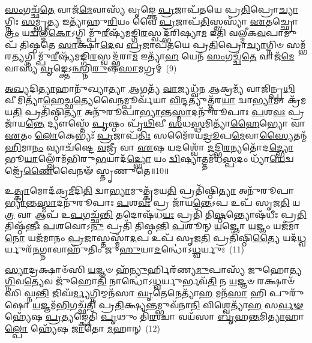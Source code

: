 \-\ul{𑌸𑌂}\-𑌗𑌚𑍍𑌛᳴\-\ul{𑌤𑍇} 𑌵𑌾𑌜᳴\-\ul{𑌮𑍇}\-𑌵𑌾𑌸𑍍𑌯᳴ 𑌵𑍃𑌙𑍍𑌕𑍍𑌤𑍇 \ul{𑌪𑍍𑌰}\-𑌜𑌾𑌪᳴𑌤𑌯𑍇 𑌪𑍍𑌰\-\ul{𑌤𑌿}\-𑌪𑍍𑌰𑍋\-\ul{𑌚𑍍𑌯𑌾}\-𑌗𑍍𑌨𑌿𑌃 \ul{𑌸}\-𑌮𑍍𑌭𑍃\-\ul{𑌤𑍍𑌯} 𑌇𑌤𑍍𑌯𑌾᳴𑌹𑍁\-\ul{𑌰𑌿}\-𑌯𑌂 𑌵𑍈 \ul{𑌪𑍍𑌰}\-𑌜𑌾𑌪᳴\-\ul{𑌤𑌿}\-𑌸𑍍𑌤𑌸𑍍𑌯𑌾᳴ \ul{𑌏}\-𑌤𑌚𑍍𑌛𑍍𑌰𑍋\-\ul{𑌤𑍍𑌰𑌂} 𑌯\-\ul{𑌦𑍍𑌵}\-𑌲𑍍𑌮𑍀\-\ul{𑌕𑍋}\-\-𑌽𑌗𑍍𑌨𑌿𑌮𑍍𑌪𑍁᳴\-\ul{𑌰𑍀}\-𑌷𑍍𑌯᳴𑌮𑌙𑍍𑌗𑌿\-\ul{𑌰}\-𑌸𑍍𑌵𑌦𑍍𑌭᳴𑌰𑌿𑌷𑍍𑌯𑌾\-\ul{𑌮} 𑌇𑌤𑌿᳴ 𑌵𑌲𑍍𑌮𑍀𑌕\-\ul{𑌵}\-𑌪𑌾𑌮𑍁𑌪᳴ 𑌤𑌿𑌷𑍍𑌠𑌤𑍇 \ul{𑌸𑌾}\-𑌕𑍍𑌷𑌾\-\ul{𑌦𑍇}\-𑌵 \ul{𑌪𑍍𑌰}\-𑌜𑌾𑌪᳴𑌤𑌯𑍇 𑌪𑍍𑌰\-\ul{𑌤𑌿}\-𑌪𑍍𑌰𑍋\-\ul{𑌚𑍍𑌯𑌾}\-𑌗𑍍𑌨𑌿𑍞 𑌸𑌮𑍍𑌭᳴𑌰\-\ul{𑌤𑍍𑌯}\-𑌗𑍍𑌨𑌿𑌮𑍍𑌪𑍁᳴\-\ul{𑌰𑍀}\-𑌷𑍍𑌯᳴𑌮𑌙𑍍𑌗𑌿\-\ul{𑌰}\-𑌸𑍍𑌵𑌦𑍍𑌭᳴𑌰𑌾\-\ul{𑌮} 𑌇𑌤𑍍𑌯𑌾᳴\-\ul{𑌹} 𑌯𑍇𑌨᳴ \ul{𑌸𑌂}\-𑌗𑌚𑍍𑌛᳴\-\ul{𑌤𑍇} 𑌵𑌾𑌜᳴\-\ul{𑌮𑍇}\-𑌵𑌾𑌸𑍍𑌯᳴ \ul{𑌵𑍃}\-𑌙𑍍𑌕𑍍𑌤𑍇\-𑌽\-\ul{𑌨𑍍𑌵}\-𑌗𑍍𑌨𑌿\-\ul{𑌰𑍁}\-𑌷\-\ul{𑌸𑌾}\-𑌮𑌗𑍍𑌰𑌮𑍍॑~(9)

\-\ul{𑌅}\-\-\ul{𑌖𑍍𑌯}\-𑌦𑌿\-\ul{𑌤𑍍𑌯𑌾}\-𑌹𑌾𑌨𑍁᳴𑌖𑍍𑌯𑌾𑌤𑍍𑌯𑌾 \ul{𑌆}\-𑌗𑌤𑍍𑌯᳴ \ul{𑌵𑌾}\-𑌜𑍍𑌯𑌧𑍍𑌵᳴𑌨 \ul{𑌆}\-𑌕𑍍𑌰𑌮𑍍𑌯᳴ 𑌵𑌾𑌜𑌿𑌨𑍍𑌪𑍃\-\ul{𑌥𑌿}\-𑌵𑍀𑌮𑌿𑌤𑍍𑌯𑌾᳴\-\ul{𑌹𑍇}\-𑌚𑍍𑌛\-\ul{𑌤𑍍𑌯𑍇}\-𑌵𑍈\-\ul{𑌨}\-𑌮𑍍𑌪𑍂𑌰𑍍𑌵᳴𑌯𑌾 \ul{𑌵𑌿}\-𑌨𑍍𑌦𑌤𑍍𑌯𑍁𑌤𑍍𑌤᳴𑌰\-\ul{𑌯𑌾} 𑌦𑍍𑌵𑌾\-\ul{𑌭𑍍𑌯𑌾}\-𑌮𑌾 𑌕𑍍𑌰᳴𑌮𑌯\-\ul{𑌤𑌿} 𑌪𑍍𑌰𑌤𑌿᳴𑌷𑍍𑌠𑌿\-\ul{𑌤𑍍𑌯𑌾} 𑌅𑌨𑍁᳴𑌰𑍂𑌪𑌾\-\ul{𑌭𑍍𑌯𑌾}\-𑌨𑍍𑌤\-\ul{𑌸𑍍𑌮𑌾}\-𑌦𑌨𑍁᳴𑌰𑍂𑌪𑌾𑌃 \ul{𑌪}\-𑌶\-\ul{𑌵𑌃} 𑌪𑍍𑌰 𑌜𑌾᳴𑌯\-\ul{𑌨𑍍𑌤𑍇} 𑌦𑍍𑌯𑍗𑌸𑍍𑌤𑍇᳴ \ul{𑌪𑍃}\-𑌷𑍍𑌠𑌂 𑌪𑍃᳴\-\ul{𑌥𑌿}\-𑌵𑍀 \ul{𑌸}\-𑌧\-\ul{𑌸𑍍𑌥}\-𑌮𑌿𑌤𑍍𑌯𑌾᳴\-\ul{𑌹𑍈}\-𑌭𑍍𑌯𑍋 𑌵𑌾 \ul{𑌏}\-𑌤𑌂 \ul{𑌲𑍋}\-𑌕𑍇𑌭𑍍𑌯𑌃᳴ \ul{𑌪𑍍𑌰}\-𑌜𑌾𑌪᳴\-\ul{𑌤𑌿𑌃} 𑌸𑌮𑍈᳴𑌰𑌯\-\ul{𑌦𑍍𑌰𑍂}\-𑌪\-\ul{𑌮𑍇}\-𑌵𑌾\-\ul{𑌸𑍍𑌯𑍈}\-𑌤𑌨𑍍𑌮᳴\-\ul{𑌹𑌿}\-𑌮𑌾\-\ul{𑌨𑌂} 𑌵𑍍𑌯𑌾𑌚᳴𑌷𑍍𑌟𑍇 \ul{𑌵}\-𑌜𑍍𑌰𑍀 𑌵𑌾 \ul{𑌏}\-𑌷 𑌯𑌦𑌶𑍍𑌵𑍋᳴ \ul{𑌦}\-𑌦𑍍𑌭𑌿\-\ul{𑌰}\-𑌨𑍍𑌯𑌤𑍋᳴𑌦\-\ul{𑌦𑍍𑌭𑍍𑌯𑍋} 𑌭𑍂\-\ul{𑌯𑌾}\-𑌲𑍍𑌲𑍋𑌁𑌮᳴𑌭𑌿𑌰𑍁\-\ul{𑌭}\-𑌯𑌾𑌦᳴\-\ul{𑌦𑍍𑌭𑍍𑌯𑍋} 𑌯𑌂 \ul{𑌦𑍍𑌵𑌿}\-𑌷𑍍𑌯𑌾𑌤𑍍𑌤𑌮᳴𑌧\-\ul{𑌸𑍍𑌪}\-𑌦𑌂 𑌧𑍍𑌯𑌾᳴\-\ul{𑌯𑍇}\-𑌦𑍍𑌵𑌜𑍍𑌰𑍇᳴\-\ul{𑌣𑍈}\-𑌵𑍈𑌨𑍟᳴ 𑌸𑍍𑌤𑍃𑌣𑍁𑌤𑍇॥10॥

{\anuvakamend[{\-\ul{𑌆}\-\-\ul{𑌹} 𑌪𑌾𑌪𑍀᳴𑌯𑌾\-\ul{𑌨𑍍𑌰𑍁}\-𑌦𑍍𑌰𑌾\-\ul{𑌦𑍇}\-𑌵 𑌯𑍇𑌨𑌾𑌗𑍍𑌰𑌂᳴ \ul{𑌵}\-𑌜𑍍𑌰𑍀 𑌵𑍈 \ul{𑌸}\-𑌪𑍍𑌤𑌦᳴𑌶 𑌚}]}%

𑌉\-\ul{𑌤𑍍𑌕𑍍𑌰𑌾}\-𑌮𑍋𑌦᳴𑌕𑍍𑌰\-\ul{𑌮𑍀}\-𑌦𑌿\-\ul{𑌤𑌿} 𑌦𑍍𑌵𑌾\-\ul{𑌭𑍍𑌯𑌾}\-𑌮𑍁𑌤𑍍𑌕𑍍𑌰᳴𑌮𑌯\-\ul{𑌤𑌿} 𑌪𑍍𑌰𑌤𑌿᳴𑌷𑍍𑌠𑌿\-\ul{𑌤𑍍𑌯𑌾} 𑌅𑌨𑍁᳴𑌰𑍂𑌪𑌾\-\ul{𑌭𑍍𑌯𑌾}\-𑌨𑍍𑌤\-\ul{𑌸𑍍𑌮𑌾}\-𑌦𑌨𑍁᳴𑌰𑍂𑌪𑌾𑌃 \ul{𑌪}\-𑌶\-\ul{𑌵𑌃} 𑌪𑍍𑌰 𑌜𑌾᳴𑌯\-\ul{𑌨𑍍𑌤𑍇}\-\-𑌽𑌪 𑌉𑌪᳴ 𑌸𑍃𑌜\-\ul{𑌤𑌿} 𑌯\-\ul{𑌤𑍍𑌰} 𑌵𑌾 𑌆𑌪᳴ 𑌉\-\ul{𑌪}\-𑌗𑌚𑍍𑌛᳴\-\ul{𑌨𑍍𑌤𑌿} 𑌤𑌦𑍋𑌷᳴𑌧\-\ul{𑌯𑌃} 𑌪𑍍𑌰𑌤𑌿᳴ 𑌤𑌿\-\ul{𑌷𑍍𑌠}\-𑌨𑍍𑌤𑍍𑌯𑍋𑌷᳴𑌧𑍀𑌃 𑌪𑍍𑌰\-\ul{𑌤𑌿}\-𑌤𑌿𑌷𑍍𑌠᳴𑌨𑍍𑌤𑍀𑌃 \ul{𑌪}\-𑌶𑌵𑍋\-𑌽\-\ul{𑌨𑍁} 𑌪𑍍𑌰𑌤𑌿᳴ 𑌤𑌿𑌷𑍍𑌠𑌨𑍍𑌤𑌿 \ul{𑌪}\-𑌶𑍂𑌨𑍍 \ul{𑌯}\-𑌜𑍍𑌞𑍋 \ul{𑌯}\-𑌜𑍍𑌞𑌂 𑌯𑌜᳴𑌮𑌾\-\ul{𑌨𑍋} 𑌯𑌜᳴𑌮𑌾𑌨𑌂 \ul{𑌪𑍍𑌰}\-𑌜𑌾𑌸𑍍𑌤𑌸𑍍𑌮𑌾᳴\-\ul{𑌦}\-𑌪 𑌉𑌪᳴ 𑌸𑍃𑌜\-\ul{𑌤𑌿} 𑌪𑍍𑌰𑌤𑌿᳴𑌷𑍍𑌠𑌿\-\ul{𑌤𑍍𑌯𑍈} 𑌯𑌦᳴\-\ul{𑌧𑍍𑌵}\-𑌰𑍍𑌯𑍁𑌰᳴\-\ul{𑌨}\-𑌗𑍍𑌨𑌾𑌵𑌾𑌹𑍁᳴𑌤𑌿𑌂 𑌜𑍁\-\ul{𑌹𑍁}\-𑌯𑌾\-\ul{𑌦}\-𑌨𑍍𑌧𑍋॑\-𑌽\-\ul{𑌧𑍍𑌵}\-𑌰𑍍𑌯𑍁𑌃~(11)

\-\ul{𑌸𑍍𑌯𑌾}\-𑌦𑍍𑌰𑌕𑍍𑌷𑌾𑍞᳴𑌸𑌿 \ul{𑌯}\-𑌜𑍍𑌞𑍞 𑌹᳴\-\ul{𑌨𑍍𑌯𑍁}\-𑌰𑍍\mbox{}𑌹𑌿𑌰᳴𑌣𑍍𑌯\-\ul{𑌮𑍁}\-𑌪𑌾𑌸𑍍𑌯᳴ 𑌜𑍁𑌹𑍋𑌤𑍍𑌯\-\ul{𑌗𑍍𑌨𑌿}\-𑌵\-\ul{𑌤𑍍𑌯𑍇}\-𑌵 𑌜𑍁᳴𑌹𑍋\-\ul{𑌤𑌿} 𑌨𑌾𑌨𑍍𑌧𑍋॑\-𑌽\-\ul{𑌧𑍍𑌵}\-𑌰𑍍𑌯𑍁𑌰𑍍𑌭𑌵᳴\-\ul{𑌤𑌿} 𑌨 \ul{𑌯}\-𑌜𑍍𑌞𑍞 𑌰𑌕𑍍𑌷𑌾𑍞᳴𑌸𑌿 𑌘𑍍𑌨\-\ul{𑌨𑍍𑌤𑌿} 𑌜𑌿𑌘᳴\-\ul{𑌰𑍍𑌮𑍍𑌯}\-𑌗𑍍𑌨𑌿𑌮𑍍𑌮𑌨᳴𑌸𑌾 \ul{𑌘𑍃}\-𑌤𑍇𑌨𑍇𑌤𑍍𑌯𑌾᳴\-\ul{𑌹} 𑌮𑌨᳴\-\ul{𑌸𑌾} 𑌹𑌿 𑌪𑍁𑌰𑍁᳴𑌷𑍋 \ul{𑌯}\-𑌜𑍍𑌞𑌮᳴\-\ul{𑌭𑌿}\-𑌗𑌚𑍍𑌛᳴𑌤𑌿 𑌪𑍍𑌰\-\ul{𑌤𑌿}\-𑌕𑍍𑌷𑍍𑌯\-\ul{𑌨𑍍𑌤}\-𑌮𑍍𑌭𑍁𑌵᳴𑌨𑌾\-\ul{𑌨𑌿} 𑌵𑌿𑌶𑍍𑌵𑍇𑌤𑍍𑌯𑌾᳴\-\ul{𑌹} 𑌸\-\ul{𑌰𑍍𑌵}\-\-\ul{𑍟} 𑌹𑍍𑌯𑍇᳴𑌷 \ul{𑌪𑍍𑌰}\-𑌤𑍍𑌯𑌙𑍍𑌕𑍍𑌷𑍇𑌤𑌿᳴ \ul{𑌪𑍃}\-𑌥𑍁𑌂 𑌤𑌿᳴\-\ul{𑌰}\-𑌶𑍍𑌚𑌾 𑌵𑌯᳴𑌸𑌾 \ul{𑌬𑍃}\-𑌹\-\ul{𑌨𑍍𑌤}\-𑌮𑌿\-\ul{𑌤𑍍𑌯𑌾}\-𑌹𑌾\-\ul{𑌲𑍍𑌪𑍋} 𑌹𑍍𑌯𑍇᳴𑌷 \ul{𑌜𑌾}\-𑌤𑍋 \ul{𑌮}\-𑌹𑌾𑌨𑍍~(12)

